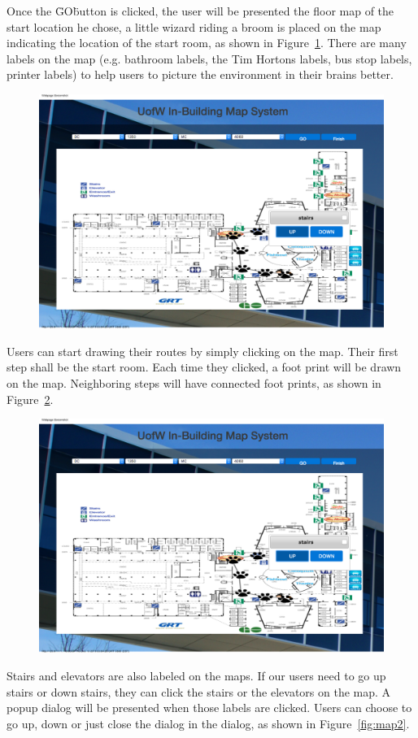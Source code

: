 \documentclass{sigchi}
\begin{document}
Once the \"GO\" button is clicked, the user will be presented the floor map of the start location he chose, a little wizard riding a broom is placed on the map indicating the location of the start room, as shown in Figure~\ref{fig:map0}. There are many labels on the map (e.g. bathroom labels, the Tim Hortons labels, bus stop labels, printer labels) to help users to picture the environment in their brains better. 

\begin{figure}[!h]
\centering
\includegraphics[width=0.6\columnwidth]{pics/map0.png}
\label{fig:map0}
\end{figure}

Users can start drawing their routes by simply clicking on the map. Their first step shall be the start room. Each time they clicked, a foot print will be drawn on the map. Neighboring steps will have connected foot prints, as shown in Figure~\ref{fig:map1}.

\begin{figure}[!h]
\centering
\includegraphics[width=0.6\columnwidth]{pics/map1.png}
\label{fig:map1}
\end{figure}


Stairs and elevators are also labeled on the maps. If our users need to go up stairs or down stairs, they can click the stairs or the elevators on the map. A popup dialog will be presented when those labels are clicked. Users can choose to go up, down or just close the dialog in the dialog, as shown in Figure~\ref{fig:map2}.
\end{document}
